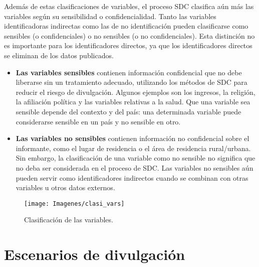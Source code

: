\documentclass[
]{book}
\theoremstyle{definition}
\theoremstyle{definition}
\theoremstyle{definition}
\theoremstyle{definition}
\theoremstyle{remark}
\begin{document}
Además de estas clasificaciones de variables, el proceso SDC clasifica aún más las variables según su sensibilidad o confidencialidad. Tanto las variables identificadoras indirectas como las de no identificación pueden clasificarse como sensibles (o confidenciales) o no sensibles (o no confidenciales). Esta distinción no es importante para los identificadores directos, ya que los identificadores directos se eliminan de los datos publicados.

\begin{itemize}
\item
  \textbf{Las variables sensibles} contienen información confidencial que no debe liberarse sin un tratamiento adecuado, utilizando los métodos de SDC para reducir el riesgo de divulgación. Algunos ejemplos son los ingresos, la religión, la afiliación política y las variables relativas a la salud. Que una variable sea sensible depende del contexto y del país: una determinada variable puede considerarse sensible en un país y no sensible en otro.
\item
  \textbf{Las variables no sensibles} contienen información no confidencial sobre el informante, como el lugar de residencia o el área de residencia rural/urbana. Sin embargo, la clasificación de una variable como no sensible no significa que no deba ser considerada en el proceso de SDC. Las variables no sensibles aún pueden servir como identificadores indirectos cuando se combinan con otras variables u otros datos externos.
\end{itemize}

\begin{figure}

{\centering \texttt{[image: Imagenes/clasi\_vars]} 

}

\caption{Clasificación de las variables.}\label{fig:clasVars}
\end{figure}

\hypertarget{escenarios-de-divulgaciuxf3n}{%
\section{Escenarios de divulgación}\label{escenarios-de-divulgaciuxf3n}}
\end{document}

